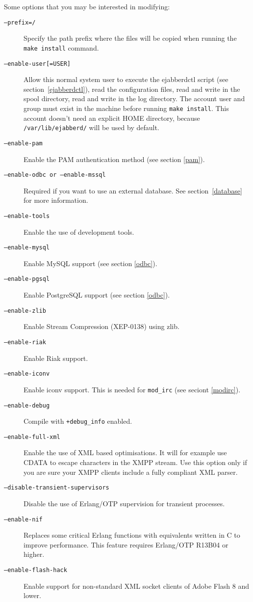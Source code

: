 \documentclass[a4paper,10pt]{book}
\newcommand{\bracehack}{\def\{{\char"7B}\def\}{\char"7D}}
\newcommand{\titem}[1]{\item[\bracehack\texttt{#1}]}
\newcommand{\term}[1]{\texttt{#1}}
\begin{document}
Some options that you may be interested in modifying:
\begin{description}
	\titem{--prefix=/}
	Specify the path prefix where the files will be copied when running
	the \term{make install} command.

	\titem{--enable-user[=USER]}
	Allow this normal system user to execute the ejabberdctl script
	(see section~\ref{ejabberdctl}),
	read the configuration files,
	read and write in the spool directory,
	read and write in the log directory.
	The account user and group must exist in the machine
	before running \term{make install}.
	This account doesn't need an explicit HOME directory, because
	\term{/var/lib/ejabberd/} will be used by default.

	\titem{--enable-pam}
	Enable the PAM authentication method (see section \ref{pam}).

	\titem{--enable-odbc or --enable-mssql}
	Required if you want to use an external database.
	See section~\ref{database} for more information.

        \titem{--enable-tools}
        Enable the use of development tools.

        \titem{--enable-mysql}
        Enable MySQL support (see section \ref{odbc}).

        \titem{--enable-pgsql}
        Enable PostgreSQL support (see section \ref{odbc}).

        \titem{--enable-zlib}
        Enable Stream Compression (XEP-0138) using zlib.

        \titem{--enable-riak}
        Enable Riak support.

        \titem{--enable-iconv}
        Enable iconv support. This is needed for \term{mod\_irc} (see seciont \ref{modirc}).

        \titem{--enable-debug}
        Compile with \term{+debug\_info} enabled.

	\titem{--enable-full-xml}
	Enable the use of XML based optimisations.
	It will for example use CDATA to escape characters in the XMPP stream.
	Use this option only if you are sure your XMPP clients include a fully compliant XML parser.

	\titem{--disable-transient-supervisors}
	Disable the use of Erlang/OTP supervision for transient processes.

	\titem{--enable-nif}
        Replaces some critical Erlang functions with equivalents written in C to improve performance.
        This feature requires Erlang/OTP R13B04 or higher.

	\titem{--enable-flash-hack}
	Enable support for non-standard XML socket clients of Adobe Flash 8 and lower.
\end{description}
\end{document}

